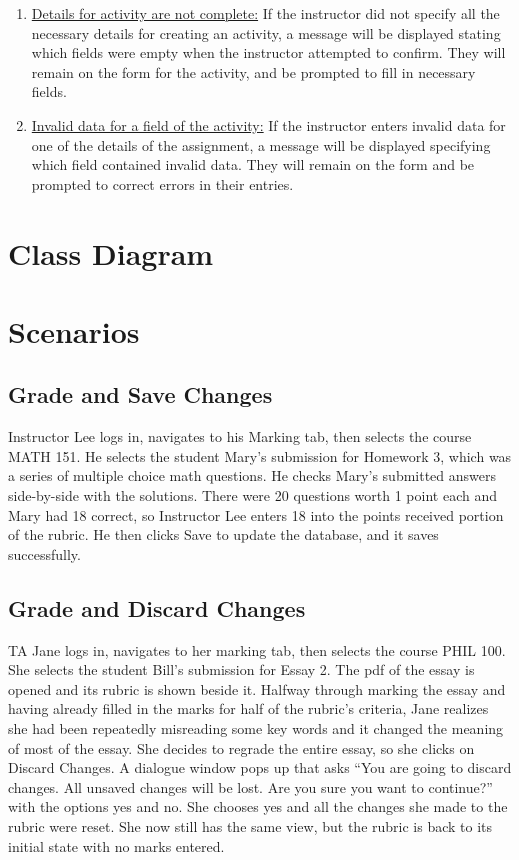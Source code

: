 \documentclass{article}
\begin{document}
\begin{enumerate}
	\item \underline{Details for activity are not complete:} If the instructor did not specify
			all the necessary details for creating an activity, a message will be displayed
			stating which fields were empty when the instructor attempted to confirm.
			They will remain on the form for the activity, and be prompted to fill in necessary
			fields.
	\item \underline{Invalid data for a field of the activity:} If the instructor enters invalid
			data for one of the details of the assignment, a message will be displayed
			specifying which field contained invalid data. They will remain on the form and
			be prompted to correct errors in their entries.
\end{enumerate}


\section{Class Diagram}

\section{Scenarios}
\subsection{Grade and Save Changes}
Instructor Lee logs in, navigates to his Marking tab, then selects the course MATH 151.
He selects the student Mary’s submission for Homework 3, which was a series of multiple
choice math questions. He checks Mary’s submitted answers side-by-side with the solutions.
There were 20 questions worth 1 point each and Mary had 18 correct, so Instructor
Lee enters 18 into the points received portion of the rubric. He then clicks Save to update
the database, and it saves successfully.

\subsection{Grade and Discard Changes}
TA Jane logs in, navigates to her marking tab, then selects the course PHIL 100. She
selects the student Bill’s submission for Essay 2. The pdf of the essay is opened and
its rubric is shown beside it. Halfway through marking the essay and having already
filled in the marks for half of the rubric’s criteria, Jane realizes she had been repeatedly
misreading some key words and it changed the meaning of most of the essay. She decides
to regrade the entire essay, so she clicks on Discard Changes. A dialogue window pops
up that asks “You are going to discard changes. All unsaved changes will be lost. Are you
sure you want to continue?” with the options yes and no. She chooses yes and all the
changes she made to the rubric were reset. She now still has the same view, but the
rubric is back to its initial state with no marks entered.
\end{document}
